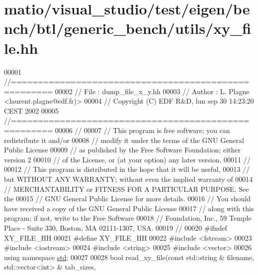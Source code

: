 \hypertarget{matio_2visual__studio_2test_2eigen_2bench_2btl_2generic__bench_2utils_2xy__file_8hh_source}{}\section{matio/visual\+\_\+studio/test/eigen/bench/btl/generic\+\_\+bench/utils/xy\+\_\+file.hh}
\label{matio_2visual__studio_2test_2eigen_2bench_2btl_2generic__bench_2utils_2xy__file_8hh_source}

\begin{DoxyCode}
00001 \textcolor{comment}{//=====================================================}
00002 \textcolor{comment}{// File   :  dump\_file\_x\_y.hh}
00003 \textcolor{comment}{// Author :  L. Plagne <laurent.plagne@edf.fr)>        }
00004 \textcolor{comment}{// Copyright (C) EDF R&D,  lun sep 30 14:23:20 CEST 2002}
00005 \textcolor{comment}{//=====================================================}
00006 \textcolor{comment}{// }
00007 \textcolor{comment}{// This program is free software; you can redistribute it and/or}
00008 \textcolor{comment}{// modify it under the terms of the GNU General Public License}
00009 \textcolor{comment}{// as published by the Free Software Foundation; either version 2}
00010 \textcolor{comment}{// of the License, or (at your option) any later version.}
00011 \textcolor{comment}{// }
00012 \textcolor{comment}{// This program is distributed in the hope that it will be useful,}
00013 \textcolor{comment}{// but WITHOUT ANY WARRANTY; without even the implied warranty of}
00014 \textcolor{comment}{// MERCHANTABILITY or FITNESS FOR A PARTICULAR PURPOSE.  See the}
00015 \textcolor{comment}{// GNU General Public License for more details.}
00016 \textcolor{comment}{// You should have received a copy of the GNU General Public License}
00017 \textcolor{comment}{// along with this program; if not, write to the Free Software}
00018 \textcolor{comment}{// Foundation, Inc., 59 Temple Place - Suite 330, Boston, MA  02111-1307, USA.}
00019 \textcolor{comment}{// }
00020 \textcolor{preprocessor}{#ifndef XY\_FILE\_HH}
00021 \textcolor{preprocessor}{#define XY\_FILE\_HH}
00022 \textcolor{preprocessor}{#include <fstream>}
00023 \textcolor{preprocessor}{#include <iostream>}
00024 \textcolor{preprocessor}{#include <string>}
00025 \textcolor{preprocessor}{#include <vector>}
00026 \textcolor{keyword}{using namespace }\hyperlink{namespacestd}{std};
00027 
00028 \textcolor{keywordtype}{bool} read\_xy\_file(\textcolor{keyword}{const} std::string & filename, std::vector<int> & tab\_sizes,

\end{DoxyCode}
